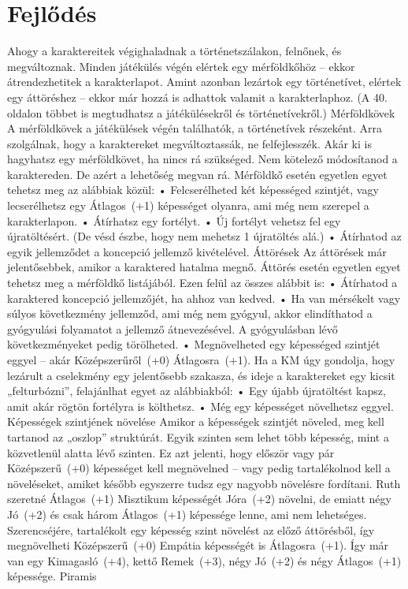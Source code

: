 \documentclass[oneside]{book}
\begin{document}
\chapter{Fejlődés}
Ahogy a karaktereitek végighaladnak a történetszálakon, felnőnek, és megváltoznak. Minden játékülés végén elértek egy mérföldkőhöz – ekkor átrendezhetitek a karakterlapot. Amint azonban lezártok egy történetívet, elértek egy áttöréshez – ekkor már hozzá is adhattok valamit a karakterlaphoz. (A 40. oldalon többet is megtudhatsz a játékülésekről és történetívekről.)
Mérföldkövek
A mérföldkövek a játékülések végén találhatók, a történetívek részeként. Arra szolgálnak, hogy a karaktereket megváltoztassák, ne felfejlesszék. Akár ki is hagyhatsz egy mérföldkövet, ha nincs rá szükséged. Nem kötelező módosítanod a karaktereden. De azért a lehetőség megvan rá.
Mérföldkő esetén egyetlen egyet tehetsz meg az alábbiak közül:
    • Felcserélheted két képességed szintjét, vagy lecserélhetsz egy Átlagos~(+1) képességet olyanra, ami még nem szerepel a karakterlapon.
    • Átírhatsz egy fortélyt.
    • Új fortélyt vehetsz fel egy újratöltésért. (De vésd észbe, hogy nem mehetsz 1 újratöltés alá.)
    • Átírhatod az egyik jellemződet a koncepció jellemző kivételével.
Áttörések
Az áttörések már jelentősebbek, amikor a karaktered hatalma megnő. Áttörés esetén egyetlen egyet tehetsz meg a mérföldkő listájából. Ezen felül az összes alábbit is:
    • Átírhatod a karaktered koncepció jellemzőjét, ha ahhoz van kedved.
    • Ha van mérsékelt vagy súlyos következmény jellemződ, ami még nem gyógyul, akkor elindíthatod a gyógyulási folyamatot a jellemző átnevezésével. A gyógyulásban lévő következményeket pedig törölheted.
    • Megnövelheted egy képességed szintjét eggyel – akár Középszerűről~(+0) Átlagosra~(+1).
Ha a KM úgy gondolja, hogy lezárult a cselekmény egy jelentősebb szakasza, és ideje a karaktereket egy kicsit „felturbózni”, felajánlhat egyet az alábbiakból:
    • Egy újabb újratöltést kapsz, amit akár rögtön fortélyra is költhetsz.
    • Még egy képességet növelhetsz eggyel.
Képességek szintjének növelése
Amikor a képességek szintjét növeled, meg kell tartanod az „oszlop” struktúrát. Egyik szinten sem lehet több képesség, mint a közvetlenül alatta lévő szinten. Ez azt jelenti, hogy először vagy pár Középszerű~(+0) képességet kell megnövelned – vagy pedig tartalékolnod kell a növeléseket, amiket később egyszerre tudsz egy nagyobb növelésre fordítani.
Ruth szeretné Átlagos~(+1) Misztikum képességét Jóra~(+2) növelni, de emiatt négy Jó~(+2) és csak három Átlagos~(+1) képessége lenne, ami nem lehetséges. Szerencséjére, tartalékolt egy képesség szint növelést az előző áttörésből, így megnövelheti Középszerű~(+0) Empátia képességét is Átlagosra~(+1). Így már van egy Kimagasló~(+4), kettő Remek~(+3), négy Jó~(+2) és négy Átlagos~(+1) képessége.
Piramis
\end{document}

